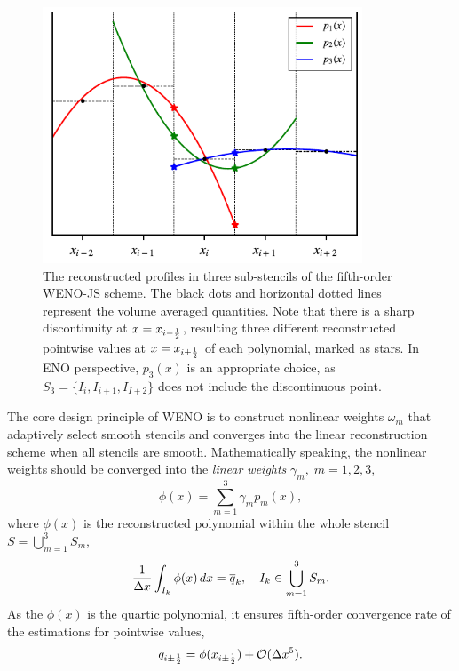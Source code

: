 \begin{figure}
    \centering
    \includegraphics[width=0.85\textwidth]{fig/weno_p1p2p3}
    \caption{The reconstructed profiles in three sub-stencils of the fifth-order WENO-JS scheme.
        The black dots and horizontal dotted lines represent the volume averaged quantities.
        Note that there is a sharp discontinuity at \( x = x_{{i-\frac{1}{2}}} \),
        resulting three different reconstructed pointwise values at \( x = x_{i \pm \frac{1}{2}} \)
        of each polynomial, marked as stars.
        In ENO perspective, \( p_{3} (x) \) is an appropriate choice, as \( S_{3} = \{ I_{i}, I_{i + 1}, I_{I + 2} \} \)
        does not include the discontinuous point.
    }\label{fig:weno_profiles}
\end{figure}
The core design principle of WENO is to construct nonlinear weights \( \omega_{m} \)
that adaptively select smooth stencils and converges into the linear reconstruction scheme
when all stencils are smooth. Mathematically speaking, the nonlinear weights should
be converged into the \textit{linear weights} \( \gamma_{m}, \; m = 1, 2, 3 \),
\begin{equation}\label{eq:weno_lin_weights}
    \phi (x) = \sum_{m=1}^{3} \gamma_{m} p_{m} (x),
\end{equation}
where \( \phi (x) \) is the reconstructed polynomial within the whole stencil \( S = \bigcup_{m=1}^{3} S_{m} \),
\begin{equation}\label{eq:weno_phi}
    \frac{1}{\Delta x} \int_{I_{k}} \phi (x) \mathop{dx} = \overline{q}_{k}, \quad
        I_{k} \in \bigcup_{m=1}^{3} S_{m}.
\end{equation}
As the \( \phi (x) \) is the quartic polynomial, it ensures fifth-order convergence rate
of the estimations for pointwise values,
\begin{equation}\label{eq:weno_phi_bigo}
    q_{i \pm \frac{1}{2}} = \phi (x_{i \pm \frac{1}{2}}) + \mathcal{O}(\Delta x^{5}).
\end{equation}

